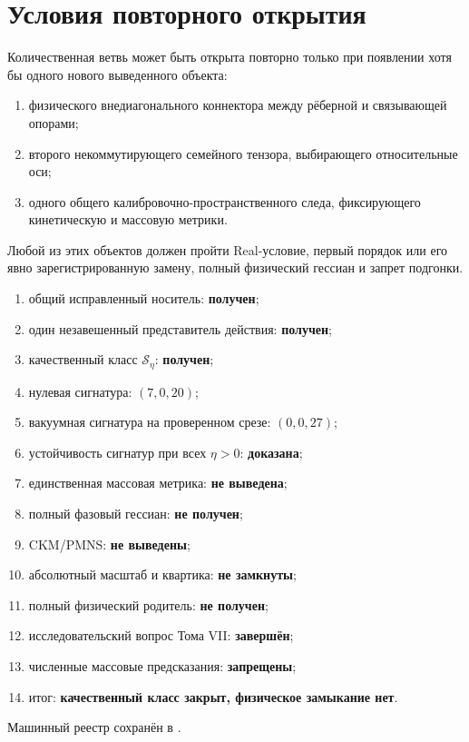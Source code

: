 \section{Условия повторного открытия}

Количественная ветвь может быть открыта повторно только при появлении хотя
бы одного нового выведенного объекта:
\begin{enumerate}
 \item физического внедиагонального коннектора между рёберной и
 связывающей опорами;
 \item второго некоммутирующего семейного тензора, выбирающего
 относительные оси;
 \item одного общего калибровочно-пространственного следа, фиксирующего
 кинетическую и массовую метрики.
\end{enumerate}
Любой из этих объектов должен пройти Real-условие, первый порядок или его
явно зарегистрированную замену, полный физический гессиан и запрет
подгонки.

\begin{protocol}
\begin{enumerate}
 \item общий исправленный носитель: \textbf{получен};
 \item один незавешенный представитель действия: \textbf{получен};
 \item качественный класс $\mathcal S_\eta$: \textbf{получен};
 \item нулевая сигнатура: \textbf{$(7,0,20)$};
 \item вакуумная сигнатура на проверенном срезе: \textbf{$(0,0,27)$};
 \item устойчивость сигнатур при всех $\eta>0$: \textbf{доказана};
 \item единственная массовая метрика: \textbf{не выведена};
 \item полный фазовый гессиан: \textbf{не получен};
 \item CKM/PMNS: \textbf{не выведены};
 \item абсолютный масштаб и квартика: \textbf{не замкнуты};
 \item полный физический родитель: \textbf{не получен};
 \item исследовательский вопрос Тома VII: \textbf{завершён};
 \item численные массовые предсказания: \textbf{запрещены};
 \item итог: \textbf{качественный класс закрыт, физическое замыкание нет}.
\end{enumerate}
\end{protocol}

Машинный реестр сохранён в
.